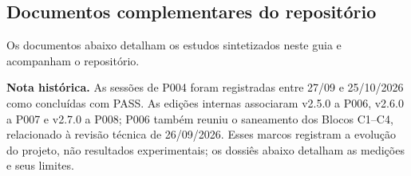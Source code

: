 \documentclass[12pt,openany,oneside,a4paper,chapter=TITLE,english,brazil]{abntex2}
\begin{document}
\begin{apendicesenv}
\chapter{Documentos complementares do repositório}\label{documentos-complementares-do-reposituxf3rio}

Os documentos abaixo detalham os estudos sintetizados neste guia e acompanham o repositório.

\begin{mdframed}[linewidth=0.6pt,innertopmargin=6pt,innerbottommargin=6pt]
\small
\textbf{Nota histórica.} As sessões de P004 foram registradas entre
27/09 e 25/10/2026 como concluídas com PASS. As edições internas
associaram v2.5.0 a P006, v2.6.0 a P007 e v2.7.0 a P008; P006 também
reuniu o saneamento dos Blocos C1--C4, relacionado à revisão técnica de
26/09/2026. Esses marcos registram a evolução do projeto, não resultados
experimentais; os dossiês abaixo detalham as medições e seus limites.
\end{mdframed}


\end{apendicesenv}
\end{document}
